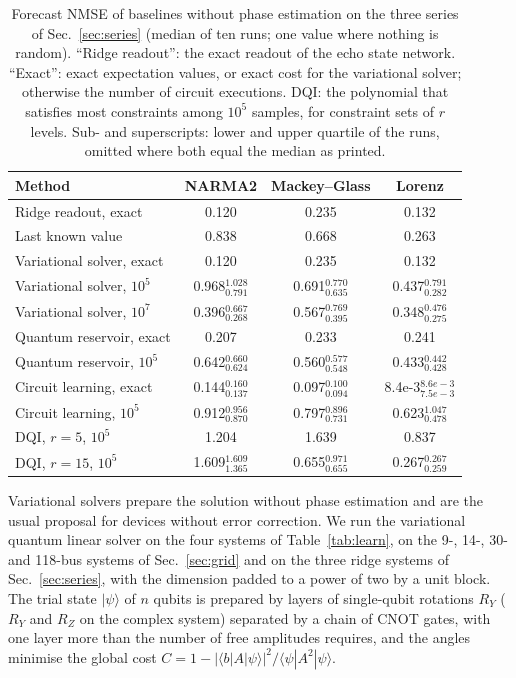 \documentclass[journal]{IEEEtran}
\begin{document}
\begin{table}[t]
\caption{Forecast NMSE of baselines without phase estimation on the three series of Sec.~\ref{sec:series} (median of ten runs; one value where nothing is random). ``Ridge readout'': the exact readout of the echo state network. ``Exact'': exact expectation values, or exact cost for the variational solver; otherwise the number of circuit executions. DQI: the polynomial that satisfies most constraints among $10^5$ samples, for constraint sets of $r$ levels. Sub- and superscripts: lower and upper quartile of the runs, omitted where both equal the median as printed.}
\label{tab:nisq}
\centering\footnotesize\renewcommand{\arraystretch}{1.3}
\setlength{\tabcolsep}{4pt}
\begin{tabular}{lccc}
\toprule
Method & NARMA2 & Mackey--Glass & Lorenz\\
\midrule
Ridge readout, exact & 0.120 & 0.235 & 0.132\\
Last known value & 0.838 & 0.668 & 0.263\\
\midrule
Variational solver, exact & 0.120 & 0.235 & 0.132\\
Variational solver, $10^5$ & 0.968$_{0.791}^{1.028}$ & 0.691$_{0.635}^{0.770}$ & 0.437$_{0.282}^{0.791}$\\
Variational solver, $10^7$ & 0.396$_{0.268}^{0.667}$ & 0.567$_{0.395}^{0.769}$ & 0.348$_{0.275}^{0.476}$\\
Quantum reservoir, exact & 0.207 & 0.233 & 0.241\\
Quantum reservoir, $10^5$ & 0.642$_{0.624}^{0.660}$ & 0.560$_{0.548}^{0.577}$ & 0.433$_{0.428}^{0.442}$\\
Circuit learning, exact & 0.144$_{0.137}^{0.160}$ & 0.097$_{0.094}^{0.100}$ & 8.4e-3$_{7.5e-3}^{8.6e-3}$\\
Circuit learning, $10^5$ & 0.912$_{0.870}^{0.956}$ & 0.797$_{0.731}^{0.896}$ & 0.623$_{0.478}^{1.047}$\\
DQI, $r=5$, $10^5$ & 1.204 & 1.639 & 0.837\\
DQI, $r=15$, $10^5$ & 1.609$_{1.365}^{1.609}$ & 0.655$_{0.655}^{0.971}$ & 0.267$_{0.259}^{0.267}$\\
\bottomrule
\end{tabular}
\end{table}

Variational solvers prepare the solution without phase estimation and are the usual proposal for devices without error correction. We run the variational quantum linear solver \cite{BravoPrieto2023} on the four systems of Table~\ref{tab:learn}, on the 9-, 14-, 30- and 118-bus systems of Sec.~\ref{sec:grid} and on the three ridge systems of Sec.~\ref{sec:series}, with the dimension padded to a power of two by a unit block. The trial state $|\psi\rangle$ of $n$ qubits is prepared by layers of single-qubit rotations $R_Y$ ($R_Y$ and $R_Z$ on the complex system) separated by a chain of CNOT gates, with one layer more than the number of free amplitudes requires, and the angles minimise the global cost $C=1-|\langle b|A|\psi\rangle|^2/\langle\psi|A^2|\psi\rangle$.
\end{document}
